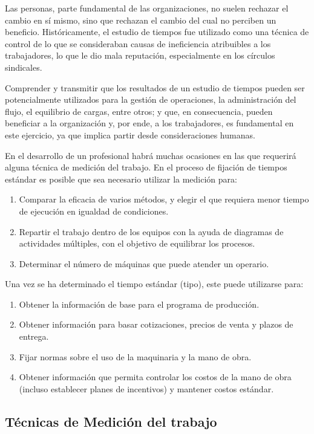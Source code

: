 \documentclass[../main]{subfiles}
\begin{document}
Las personas, parte fundamental de las organizaciones, no suelen
rechazar el cambio en sí mismo, sino que rechazan el cambio del cual
no perciben un beneficio. Históricamente, el estudio de tiempos fue
utilizado como una técnica de control de lo que se consideraban
causas de ineficiencia atribuibles a los trabajadores, lo que le dio
mala reputación, especialmente en los círculos sindicales.

Comprender y transmitir que los resultados de un estudio de tiempos
pueden ser potencialmente utilizados para la gestión de operaciones,
la administración del flujo, el equilibrio de cargas, entre otros; y
que, en consecuencia, pueden beneficiar a la organización y, por
ende, a los trabajadores, es fundamental en este ejercicio, ya que
implica partir desde consideraciones humanas.

En el desarrollo de un profesional habrá muchas ocasiones en las que
requerirá alguna técnica de medición del trabajo. En el proceso de
fijación de tiempos estándar es posible que sea necesario utilizar la
medición para:

\begin{enumerate}
  \item Comparar la eficacia de varios métodos, y elegir el que
    requiera menor tiempo de ejecución en igualdad de condiciones.
  \item Repartir el trabajo dentro de los equipos con la ayuda de
    diagramas de actividades múltiples, con el objetivo de equilibrar
    los procesos.
  \item Determinar el número de máquinas que puede atender un operario.
\end{enumerate}

Una vez se ha determinado el tiempo estándar (tipo), este puede utilizarse para:
\begin{enumerate}
  \item Obtener la información de base para el programa de producción.
  \item Obtener información para basar cotizaciones, precios de venta
    y plazos de entrega.
  \item Fijar normas sobre el uso de la maquinaria y la mano de obra.
  \item Obtener información que permita controlar los costos de la
    mano de obra (incluso establecer planes de incentivos) y mantener
    costos estándar.

\end{enumerate}

\subsection{Técnicas de Medición del trabajo}
\end{document}
